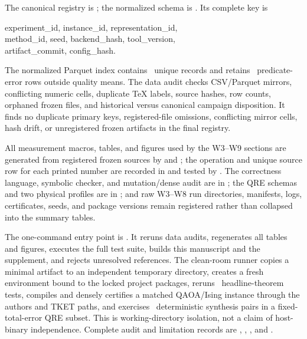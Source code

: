 \documentclass[aps,prx,reprint,floatfix,superscriptaddress]{revtex4-2}
\begin{document}
The canonical registry is ; the normalized schema is
.  Its complete key is
\begin{center}
\footnotesize\ttfamily
experiment\_id, instance\_id, representation\_id,\\
method\_id, seed, backend\_hash, tool\_version,\\
artifact\_commit, config\_hash.
\end{center}
The normalized Parquet index contains \UnifiedRows\ unique records and retains
\UnifiedPredicateErrors\ predicate-error rows outside quality means.  The data
audit checks CSV/Parquet mirrors, conflicting numeric cells, duplicate TeX
labels, source hashes, row counts, orphaned frozen files, and historical versus
canonical campaign disposition.  It finds no duplicate primary keys,
registered-file omissions, conflicting mirror cells, hash drift, or
unregistered frozen artifacts in the final registry.

All measurement macros, tables, and figures used by the W3--W9 sections are
generated from registered frozen sources by
 and
; the operation and unique source row for
each printed number are recorded in  and tested
by .  The correctness language,
symbolic checker, and mutation/dense audit are in ; the
QRE schemas and two physical profiles are in ; and raw W3--W8 run
directories, manifests, logs, certificates, seeds, and package versions remain
registered rather than collapsed into the summary tables.

The one-command entry point is
.  It reruns data audits, regenerates
all tables and figures, executes the full test suite, builds this manuscript
and the supplement, and rejects unresolved references.  The clean-room runner
copies a minimal artifact to an independent temporary directory, creates a
fresh environment bound to the locked project packages, reruns
\CleanTheoryTests\ headline-theorem tests, compiles and densely certifies a
matched QAOA/Ising instance through the authors and TKET paths, and exercises
\CleanGridPairs\ deterministic synthesis pairs in a fixed-total-error QRE
subset.  This is working-directory isolation, not a claim of host-binary
independence.  Complete audit and limitation records are
, ,
, and .
\end{document}
